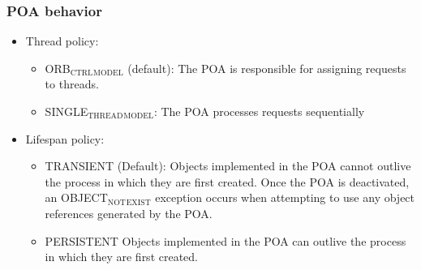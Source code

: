 \documentclass[bigger,hyperref={colorlinks=true, urlcolor=red, plainpages=false, pdfpagelabels, bookmarksnumbered}]{beamer}
\begin{document}
\begin{frame}
\frametitle{POA behavior}
\label{sec-4-11}
\begin{itemize}

\item Thread policy:
\label{sec-4-11-1}%
\begin{itemize}
\item ORB$_{\mathrm{CTRL}}$$_{\mathrm{MODEL}}$ (default): The POA is responsible for assigning requests to threads.
\item SINGLE$_{\mathrm{THREAD}}$$_{\mathrm{MODEL}}$: The POA processes requests sequentially
\end{itemize}


\item Lifespan policy:
\label{sec-4-11-2}%
\begin{itemize}
\item TRANSIENT (Default): Objects implemented in the POA cannot outlive the process in 
      which they are first created. Once the POA is deactivated, an OBJECT$_{\mathrm{NOT}}$$_{\mathrm{EXIST}}$ exception occurs 
      when attempting to use any object references generated by the POA.
\item PERSISTENT Objects implemented in the POA can outlive the process in which they are first created.
\end{itemize}





\end{itemize} %
\end{frame}
\end{document}
